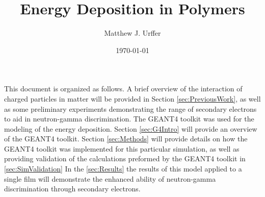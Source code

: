 \documentclass[]{report}
\title{Energy Deposition in Polymers}
\author{Matthew J. Urffer}
\date{\today}
\numberwithin{equation}{section}
\begin{document}
\maketitle

\listoftodos


This document is organized as follows.
A brief overview of the interaction of charged particles in matter will be provided in Section \ref{sec:PreviousWork}, as well as some preliminary experiments demonstrating the range of secondary electrons to aid in neutron-gamma discrimination.
The GEANT4 toolkit was used for the modeling of the energy deposition.  Section \ref{sec:G4Intro} will provide an overview of the GEANT4 toolkit.
Section \ref{sec:Methods} will provide details on how the GEANT4 toolkit was implemented for this particular simulation, as well as providing validation of the calculations preformed by the GEANT4 toolkit in \ref{sec:SimValidation}
In the \ref{sec:Results} the results of this model applied to a single film will demonstrate the enhanced ability of neutron-gamma discrimination through secondary electrons.






\end{document}

